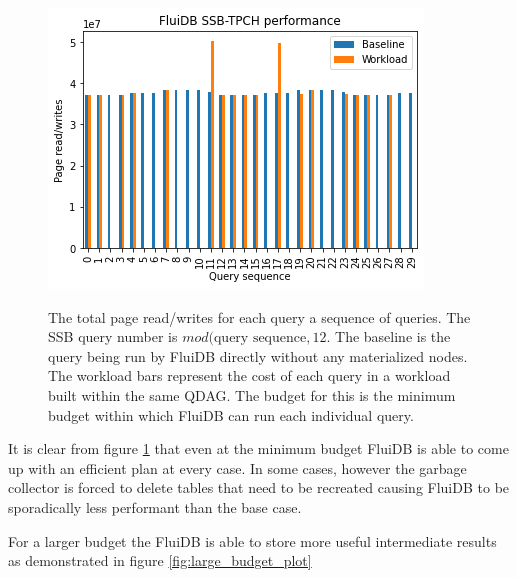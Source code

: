 \begin{figure}[p]
\centering
\includegraphics[width=.9\linewidth]{./imgs/2021-12-03_18-36-27_screenshot.png}
\label{fig:min_budget_plot}
\caption{The total page read/writes for each query a sequence of
  queries. The SSB query number is \(mod(\text{query
    sequence},12\). The baseline is the query being run by FluiDB
  directly without any materialized nodes. The workload bars represent
  the cost of each query in a workload built within the same QDAG. The
  budget for this is the minimum budget within which FluiDB can run
  each individual query.}
\end{figure}

It is clear from figure \ref{fig:min_budget_plot} that even at the minimum budget
FluiDB is able to come up with an efficient plan at every case. In
some cases, however the garbage collector is forced to delete tables
that need to be recreated causing FluiDB to be sporadically less
performant than the base case.

For a larger budget the FluiDB is able to store more useful
intermediate results as demonstrated in figure \ref{fig:large_budget_plot}

